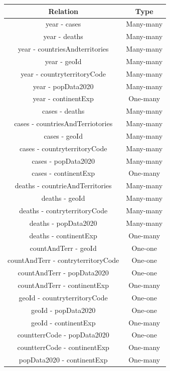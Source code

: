 \documentclass[12pt,oneside,a4paper,english]{article}
\begin{document}
  \begin{tabular}[t]{c c} %
  \hline\hline %
  \textbf{Relation} & \textbf{Type} \\ [0.5ex]
  \hline %
  year - cases & Many-many\\ [0.5ex]
  year - deaths & Many-many\\ [0.5ex]
  year - countriesAndterritories & Many-many\\ [0.5ex]
  year - geoId & Many-many\\ [0.5ex]
  year - countryterritoryCode & Many-many\\ [0.5ex]
  year - popData2020 & Many-many\\ [0.5ex]
  year - continentExp & One-many\\ [0.5ex]
  cases - deaths & Many-many\\ [0.5ex]
  cases - countriesAndTerriotories & Many-many\\ [0.5ex]
  cases - geoId & Many-many\\ [0.5ex]
  cases - countryterritoryCode & Many-many\\ [0.5ex]
  cases - popData2020 & Many-many\\ [0.5ex]
  cases - continentExp & One-many\\ [0.5ex]
  deaths - countrieAndTerritories & Many-many\\ [0.5ex]
  deaths - geoId & Many-many\\ [0.5ex]
  deaths - contryterritoryCode & Many-many\\ [0.5ex]
  deaths - popData2020 & Many-many\\ [0.5ex]
  deaths - continentExp &One-many\\ [0.5ex]
  countAndTerr - geoId & One-one\\ [0.5ex]
  countAndTerr - contryterritoryCode & One-one\\ [0.5ex]
  countAndTerr - popData2020 & One-one\\ [0.5ex]
  countAndTerr - continentExp & One-many\\ [0.5ex]
  geoId - countryterritoryCode & One-one\\ [0.5ex]
  geoId - popData2020 & One-one\\ [0.5ex]
  geoId - continentExp & One-many\\ [0.5ex]
  countterrCode - popData2020 & One-one\\ [0.5ex]
  countterrCode - continentExp & One-many\\ [0.5ex]
  popData2020 - continentExp & One-many\\ [0.5ex]
  \hline
\end{tabular}
\end{document}
